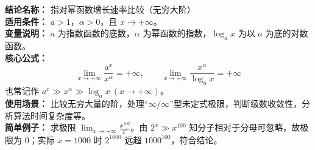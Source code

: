 \textbf{结论名称：} 指对幂函数增长速率比较（无穷大阶）\\
\textbf{适用条件：} $a>1$，$\alpha>0$，且 $x\to +\infty$。\\
\textbf{变量说明：} $a$ 为指数函数的底数，$\alpha$ 为幂函数的指数，$\log_a x$ 为以 $a$ 为底的对数函数。\\
\textbf{核心公式：} \[ \boxed{\lim_{x\to+\infty}\frac{a^x}{x^\alpha}=+\infty,\qquad \lim_{x\to+\infty}\frac{x^\alpha}{\log_a x}=+\infty} \] 也常记作 $a^x \gg x^\alpha \gg \log_a x\ (x\to+\infty)$。\\
\textbf{使用场景：} 比较无穷大量的阶，处理“$\infty/\infty$”型未定式极限，判断级数收敛性，分析算法时间复杂度等。\\
\textbf{简单例子：} 求极限 $\displaystyle\lim_{x\to+\infty}\frac{x^{100}}{2^x}$。由 $2^x \gg x^{100}$ 知分子相对于分母可忽略，故极限为 $0$；实际 $x=1000$ 时 $2^{1000}$ 远超 $1000^{100}$，符合结论。